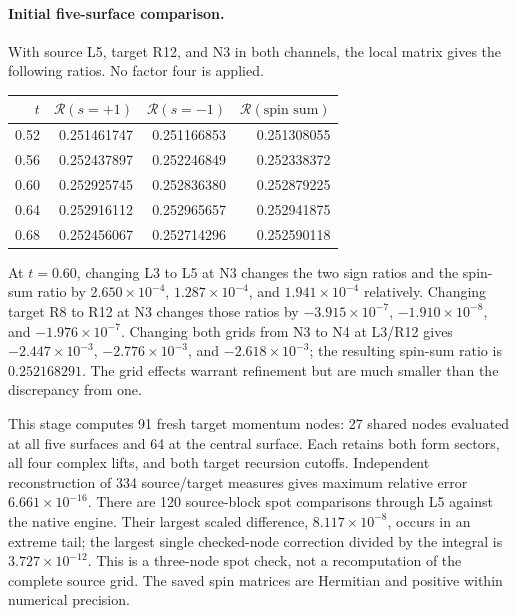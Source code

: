 \paragraph{Initial five-surface comparison.}
With source L5, target R12, and N3 in both channels, the local
matrix gives the following ratios. No factor four is applied.
\begin{center}
\begin{tabular}{rrrr}
\toprule
$t$ & $\mathcal R(s=+1)$ & $\mathcal R(s=-1)$ & $\mathcal R(\text{spin sum})$\\
\midrule
0.52 & 0.251461747 & 0.251166853 & 0.251308055\\
0.56 & 0.252437897 & 0.252246849 & 0.252338372\\
0.60 & 0.252925745 & 0.252836380 & 0.252879225\\
0.64 & 0.252916112 & 0.252965657 & 0.252941875\\
0.68 & 0.252456067 & 0.252714296 & 0.252590118\\
\bottomrule
\end{tabular}
\end{center}
At $t=0.60$, changing L3 to L5 at N3 changes the two sign ratios
and the spin-sum ratio by $2.650\times10^{-4}$,
$1.287\times10^{-4}$, and $1.941\times10^{-4}$ relatively.
Changing target R8 to R12 at N3 changes those ratios by
$-3.915\times10^{-7}$, $-1.910\times10^{-8}$, and
$-1.976\times10^{-7}$. Changing both grids from N3 to N4 at
L3/R12 gives $-2.447\times10^{-3}$, $-2.776\times10^{-3}$,
and $-2.618\times10^{-3}$; the resulting spin-sum ratio is
$0.252168291$. The grid effects warrant refinement but are much
smaller than the discrepancy from one.

This stage computes 91 fresh target momentum nodes: 27 shared
nodes evaluated at all five surfaces and 64 at the central
surface. Each retains both form sectors, all four complex
lifts, and both target recursion cutoffs. Independent
reconstruction of 334 source/target measures gives maximum
relative error $6.661\times10^{-16}$.
There are 120 source-block spot comparisons through L5 against
the native engine. Their largest scaled difference,
$8.117\times10^{-8}$, occurs in an extreme tail; the largest
single checked-node correction divided by the integral is
$3.727\times10^{-12}$. This is a three-node spot check, not
a recomputation of the complete source grid. The saved spin
matrices are Hermitian and positive within numerical precision.

